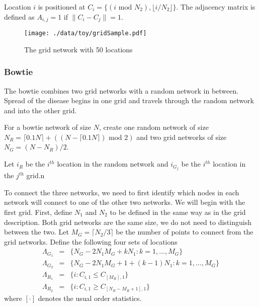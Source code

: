 \documentclass[11pt]{article}
\begin{document}
Location $i$ is positioned at $C_i = \lbrace (i \text{ mod } N_2), \lfloor
i/N_2 \rfloor \rbrace$.  The adjacency matrix is defined as $A_{i,j} =
1$ if $\|C_i - C_j\| = 1$.

\begin{figure}[htb]
\centering
\texttt{[image: ./data/toy/gridSample.pdf]}
\caption{\label{fig:grid25}The grid network with 50 locations}
\end{figure}



\subsubsection{Bowtie}
\label{sec-3-1-5}

The bowtie combines two grid networks with a random network in
between.  Spread of the disease begins in one grid and travels through
the random network and into the other grid.

For a bowtie network of size $N$, create one random network of size
$N_R = \lceil 0.1 N \rceil + ((N - \lceil 0.1 N \rceil) \text{ mod }
2)$ and two grid networks of size $N_G = (N - N_R)/2$.

Let $i_{R}$ be the $i^{th}$ location in the random network and
$i_{G_j}$ be the $i^{th}$ location in the $j^{th}$ grid.n

To connect the three networks, we need to first identify which nodes
in each network will connect to one of the other two networks.  We
will begin with the first grid.  First, define $N_1$ and $N_2$ to be
defined in the same way as in the grid description.  Both grid
networks are the same size, we do not need to distinguish between the
two.  Let $M_{G} = \lceil N_2/3 \rceil$ be the number of points to
connect from the grid networks.  Define the following four sets of locations
\begin{equation*}
  \begin{array}{rcl}
    \Lambda_{G_1} & = & \lbrace N_G -
                        2N_1M_G + kN_1 : k = 1,\ldots,M_G\rbrace\\
    \Lambda_{G_2} & = & \lbrace N_G -
                        2N_1M_G + 1 + (k-1)N_1 : k =
                        1,\ldots,M_G\rbrace\\
    \Lambda_{R_1} & = & \lbrace i : C_{i,1} \le C_{[M_R],1} \rbrace\\
    \Lambda_{R_2} & = & \lbrace i : C_{i,1} \ge C_{[N_R - M_R + 1],1} \rbrace
  \end{array}
\end{equation*}
where $[\cdot]$ denotes the usual order statistics.
\end{document}
